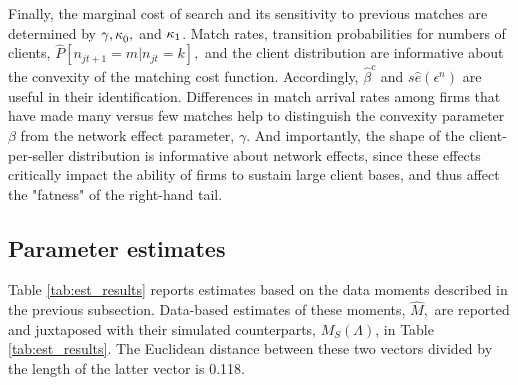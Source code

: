 Finally, the marginal cost of search and its sensitivity to previous matches
are determined by ${\normalsize \gamma ,\kappa }_{0}{\normalsize ,}$ and $%
{\normalsize \kappa }_{1}$. Match rates, transition probabilities for
numbers of clients, $\widehat{P}[n_{jt+1}=m|n_{jt}=k],$ and the client
distribution are informative about the convexity of the matching cost
function. Accordingly, $\widehat{\beta }^{c}$ and $s\widehat{e}(\epsilon
^{n})$ are useful in their identification. Differences in match arrival
rates among firms that have made many versus few matches help to distinguish
the convexity parameter $\beta $ from the network effect parameter, $\gamma
. $ And importantly, the shape of the client-per-seller distribution is
informative about network effects, since these effects critically impact the
ability of firms to sustain large client bases, and thus affect the
"fatness" of the right-hand tail.

\subsection{Parameter estimates}

Table \ref{tab:est_results} reports estimates based on the data moments described in the
previous subsection. Data-based estimates of these moments, $\widehat{M},$
are reported and juxtaposed with their simulated counterparts, $%
M_{S}(\Lambda )$, in Table \ref{tab:est_results}.\footnotemark{} The Euclidean distance between these two
vectors divided by the length of the latter vector is 0.118.

